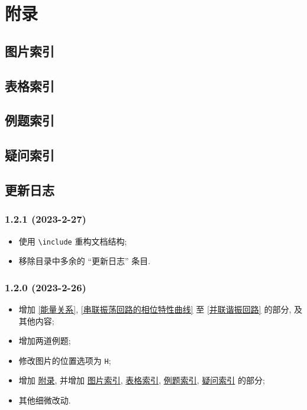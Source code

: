 \section{附录} \label{附录}
\subsection{图片索引} \label{图片索引}
\makeatletter
{}
\makeatother

\subsection{表格索引} \label{表格索引}
\makeatletter
{}
\makeatother

\subsection{例题索引} \label{例题索引}
\listofexampleprobs

\subsection{疑问索引} \label{疑问索引}
\listofquestions

\subsection{更新日志} \label{更新日志}
\subsubsection*{1.2.1 (2023-2-27)}
\begin{itemize}
    \item 使用 \texttt{\textbackslash include} 重构文档结构;
    \item 移除目录中多余的 ``更新日志'' 条目.
\end{itemize}

\subsubsection*{1.2.0 (2023-2-26)}
\begin{itemize}
    \item 增加 \ref{能量关系}, \ref{串联振荡回路的相位特性曲线} 至 \ref{并联谐振回路} 的部分, 及其他内容;
    \item 增加两道例题;
    \item 修改图片的位置选项为 \texttt{H};
    \item 增加 \hyperref[附录]{附录}, 并增加 \hyperref[图片索引]{图片索引}, \hyperref[表格索引]{表格索引}, \hyperref[例题索引]{例题索引}, \hyperref[疑问索引]{疑问索引} 的部分;
    \item 其他细微改动.
\end{itemize}


